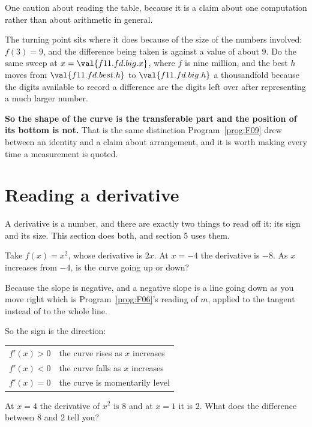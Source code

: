 \begin{fr}
One caution about reading the table, because it is a claim about one
computation rather than about arithmetic in general.

The turning point sits where it does because of the size of the numbers
involved: $f(3) = 9$, and the difference being taken is against a value of
about $9$. Do the same sweep at $x = \val{f11.fd.big.x}$, where $f$ is nine
million, and the best $h$ moves from $\val{f11.fd.best.h}$ to
$\val{f11.fd.big.h}$ \dash{} a thousandfold \dash{} because the digits
available to record a difference are the digits left over after representing a
much larger number.

\textbf{So the shape of the curve is the transferable part and the position of
its bottom is not.} That is the same distinction Program~\ref{prog:F09} drew
between an identity and a claim about arrangement, and it is worth making
every time a measurement is quoted.
\end{fr}

\section{Reading a derivative}
\label{sec:F11-reading}

\begin{fr}
A derivative is a number, and there are exactly two things to read off it: its
sign and its size. This section does both, and section 5 uses them.

Take $f(x) = x^{2}$, whose derivative is $2x$. At $x = -4$ the derivative is
$-8$. As $x$ increases from $-4$, is the curve going up or down?
\nextframe
\end{fr}

\begin{fr}
Because the slope is negative, and a negative slope is a line going down as
you move right \dash{} which is Program~\ref{prog:F06}'s reading of $m$,
applied to the tangent instead of to the whole line.

So the sign is the direction:

\begin{center}
\begin{tabular}{ll}
\toprule
$f'(x) > 0$ & the curve rises as $x$ increases \\
$f'(x) < 0$ & the curve falls as $x$ increases \\
$f'(x) = 0$ & the curve is momentarily level \\
\bottomrule
\end{tabular}
\end{center}

At $x = 4$ the derivative of $x^{2}$ is $8$ and at $x = 1$ it is $2$. What
does the difference between $8$ and $2$ tell you?
\nextframe
\end{fr}

